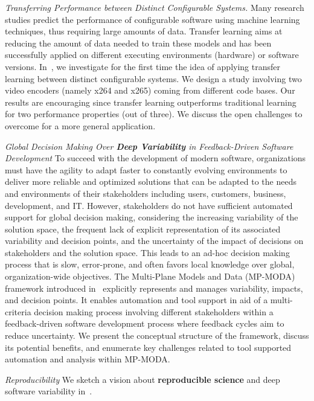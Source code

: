  \emph{Transferring Performance between Distinct Configurable Systems.} Many research studies predict the performance of configurable software using machine learning techniques, thus requiring large amounts of data. Transfer learning aims at reducing the amount of data needed to train these models and has been successfully applied on different executing environments (hardware) or software versions.  In~\cite{lesoil:hal-03514984}, we investigate for the first time the idea of applying transfer learning between distinct configurable systems. We design a study involving two video encoders (namely x264 and x265) coming from different code bases. Our results are encouraging since transfer learning outperforms traditional learning for two performance properties (out of three). We discuss the open challenges to overcome for a more general application. 
  
  
 \emph{Global Decision Making Over \textbf{Deep Variability} in Feedback-Driven Software Development}
 To succeed with the development of modern software, organizations must have the agility to adapt faster to constantly evolving environments to deliver more reliable and optimized solutions that can be adapted to the needs and environments of their stakeholders including users, customers, business, development, and IT. However, stakeholders do not have sufficient automated support for global decision making, considering the increasing variability of the solution space, the frequent lack of explicit representation of its associated variability and decision points, and the uncertainty of the impact of decisions on stakeholders and the solution space. This leads to an ad-hoc decision making process that is slow, error-prone, and often favors local knowledge over global, organization-wide objectives. The Multi-Plane Models and Data (MP-MODA) framework introduced in~\cite{kienzle:hal-03770004} explicitly represents and manages variability, impacts, and decision points. It enables automation and tool support in aid of a multi-criteria decision making process involving different stakeholders within a feedback-driven software development process where feedback cycles aim to reduce uncertainty. We present the conceptual structure of the framework, discuss its potential benefits, and enumerate key challenges related to tool supported automation and analysis within MP-MODA.
 
  \emph{Reproducibility} We sketch a vision about \textbf{reproducible science} and deep software variability in~\cite{acher:hal-03528889}. 
 
